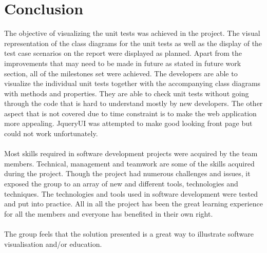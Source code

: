 \documentclass[a4paper,12pt]{Article}
\begin{document}
\section{Conclusion}
The objective of visualizing the unit tests was achieved in the project. The visual representation of the class diagrams for the unit tests as well as the display of the test case scenarios on the report were displayed as planned. Apart from the improvements that may need to be made in future as stated in future work section, all of the milestones set were achieved. The developers are able to visualize the individual unit tests together with the accompanying class diagrams with methods and properties.  They are able to check unit tests without going through the code that is hard to understand mostly by new developers. The other aspect that is not covered due to time constraint is to make the web application more appealing. JqueryUI was attempted to make good looking front page but could not work unfortunately.
\\\\Most skills required in software development projects were acquired by the team members. Technical, management and teamwork are some of the skills acquired during the project. Though the project had numerous challenges and issues, it exposed the group to an array of new and different tools, technologies and techniques. The technologies and tools used in software development were tested and put into practice.  All in all the project has been the great learning experience for all the members and everyone has benefited in their own right.
\\\\The group feels that the solution presented is a great way to illustrate software visualisation and/or education. 











\newpage
\end{document}
